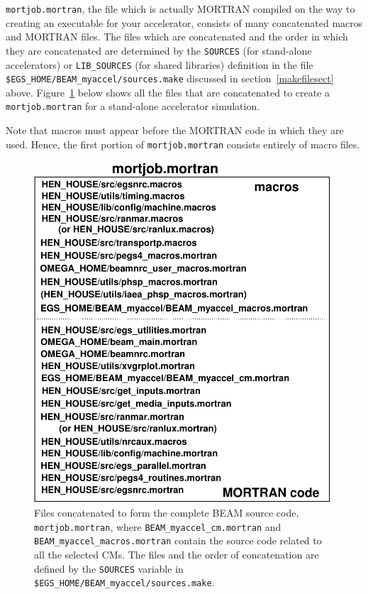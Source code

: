 \documentclass[12pt,twoside]{article}
\begin{document}
{\tt mortjob.mortran}, the file which is actually MORTRAN compiled on the
way to creating an executable for your accelerator, consists of
many concatenated macros and MORTRAN files.  The files which are concatenated
and the order in which they are concatenated are determined by the
{\tt SOURCES} (for stand-alone accelerators) or
{\tt LIB\_SOURCES} (for shared libraries) definition in the file
{\tt \$EGS\_HOME/BEAM\_myaccel/sources.make}
discussed in section~\ref{makefilesect} above.  Figure~\ref{fig_mortjob}
below shows all the files that are concatenated to create a {\tt mortjob.mortran} for a stand-alone accelerator simulation.

Note that macros must appear before the MORTRAN code in which they are
used.  Hence, the first portion of {\tt mortjob.mortran} consists entirely
of macro files.

\begin{figure}[htb]
\begin{center}
\leavevmode
\mbox{}\hspace{0cm}
  
 
  
\includegraphics[width=12cm]{figures/mortjob-mortran}
\caption[Files making up the complete BEAM source code.]
{Files concatenated to form the complete BEAM source code,
{\tt mortjob.mortran}, where {\tt BEAM\_myaccel\_cm.mortran}
and {\tt BEAM\_myaccel\_macros.mortran} contain
the source code related to all the selected CMs.  The files and
the order of concatenation are defined by the {\tt SOURCES} variable
in {\tt \$EGS\_HOME/BEAM\_myaccel/sources.make}.}
\label{fig_mortjob}
\end{center}
\end{figure}
\end{document}
